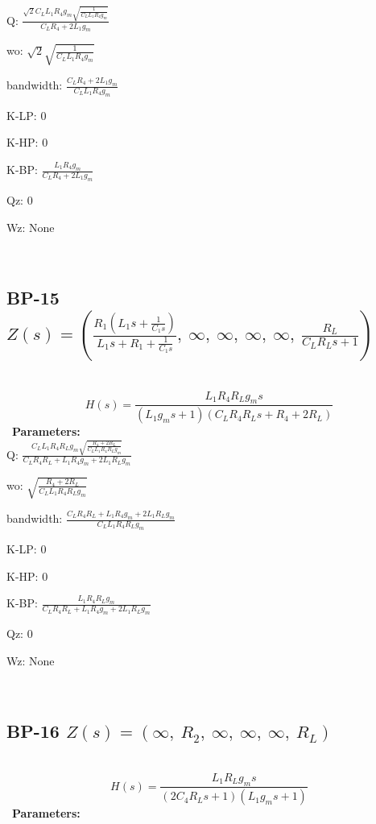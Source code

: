 \documentclass{article}
\begin{document}
Q: $\frac{\sqrt{2} C_{L} L_{1} R_{4} g_{m} \sqrt{\frac{1}{C_{L} L_{1} R_{4} g_{m}}}}{C_{L} R_{4} + 2 L_{1} g_{m}}$\ 

wo: $\sqrt{2} \sqrt{\frac{1}{C_{L} L_{1} R_{4} g_{m}}}$\ 

bandwidth: $\frac{C_{L} R_{4} + 2 L_{1} g_{m}}{C_{L} L_{1} R_{4} g_{m}}$\ 

K-LP: $0$\ 

K-HP: $0$\ 

K-BP: $\frac{L_{1} R_{4} g_{m}}{C_{L} R_{4} + 2 L_{1} g_{m}}$\ 

Qz: $0$\ 

Wz: $\text{None}$\ 

\ 

\subsection{BP-15 $Z(s) = \left( \frac{R_{1} \left(L_{1} s + \frac{1}{C_{1} s}\right)}{L_{1} s + R_{1} + \frac{1}{C_{1} s}}, \  \infty, \  \infty, \  \infty, \  \infty, \  \frac{R_{L}}{C_{L} R_{L} s + 1}\right)$ } \ 
\textbf{\[H(s) = \frac{L_{1} R_{4} R_{L} g_{m} s}{\left(L_{1} g_{m} s + 1\right) \left(C_{L} R_{4} R_{L} s + R_{4} + 2 R_{L}\right)}\] } \ 
\textbf{Parameters:}\\ 

Q: $\frac{C_{L} L_{1} R_{4} R_{L} g_{m} \sqrt{\frac{R_{4} + 2 R_{L}}{C_{L} L_{1} R_{4} R_{L} g_{m}}}}{C_{L} R_{4} R_{L} + L_{1} R_{4} g_{m} + 2 L_{1} R_{L} g_{m}}$\ 

wo: $\sqrt{\frac{R_{4} + 2 R_{L}}{C_{L} L_{1} R_{4} R_{L} g_{m}}}$\ 

bandwidth: $\frac{C_{L} R_{4} R_{L} + L_{1} R_{4} g_{m} + 2 L_{1} R_{L} g_{m}}{C_{L} L_{1} R_{4} R_{L} g_{m}}$\ 

K-LP: $0$\ 

K-HP: $0$\ 

K-BP: $\frac{L_{1} R_{4} R_{L} g_{m}}{C_{L} R_{4} R_{L} + L_{1} R_{4} g_{m} + 2 L_{1} R_{L} g_{m}}$\ 

Qz: $0$\ 

Wz: $\text{None}$\ 

\ 

\subsection{BP-16 $Z(s) = \left( \infty, \  R_{2}, \  \infty, \  \infty, \  \infty, \  R_{L}\right)$ } \ 
\textbf{\[H(s) = \frac{L_{1} R_{L} g_{m} s}{\left(2 C_{4} R_{L} s + 1\right) \left(L_{1} g_{m} s + 1\right)}\] } \ 
\textbf{Parameters:}\\ 
\end{document}
